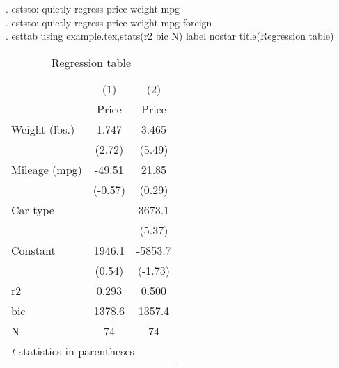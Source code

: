 \documentclass[12pt]{article}
\begin{document}
\vspace{1in}

\noindent . eststo: quietly regress price weight mpg\\
. eststo: quietly regress price weight mpg foreign\\
. esttab using example.tex,stats(r2 bic N) label nostar title(Regression table\label{tab1})\\

\begin{table}[htbp]\centering \caption{Regression table\label{tab1}} \begin{tabular}{l*{2}{c}} \hline\hline
                    &\multicolumn{1}{c}{(1)}&\multicolumn{1}{c}{(2)}\\
                    &\multicolumn{1}{c}{Price}&\multicolumn{1}{c}{Price}\\
\hline
Weight (lbs.)       &       1.747&       3.465\\
                    &      (2.72)&      (5.49)\\
[1em]
Mileage (mpg)       &      -49.51&       21.85\\
                    &     (-0.57)&      (0.29)\\
[1em]
Car type            &            &      3673.1\\
                    &            &      (5.37)\\
[1em]
Constant            &      1946.1&     -5853.7\\
                    &      (0.54)&     (-1.73)\\
\hline
r2                  &       0.293&       0.500\\
bic                 &      1378.6&      1357.4\\
N                   &          74&          74\\
\hline\hline
\multicolumn{3}{l}{\footnotesize \textit{t} statistics in parentheses}\\
\end{tabular}
\end{table}
\end{document}
